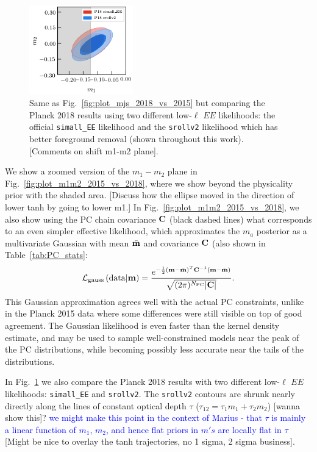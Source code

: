 \documentclass[prd,twocolumn,amsmath,amssymb,floatfix,superscriptaddress,nofootinbib]{revtex4-1}
\newcommand{\wh}[1]{\textcolor{blue}{#1}}
\begin{document}
\begin{figure}
\includegraphics[width=0.4\textwidth]{plots/plot_m1_m2_pl18_pc_zmax30_pliklite_0930_vs_pl18_pc_zmax30_pliklite_srollv2_1015.png}
\caption{Same as Fig.~\ref{fig:plot_mjs_2018_vs_2015} but comparing the Planck 2018 results using two different low-$\ell$ $EE$ likelihoods: the official \texttt{simall\_EE} likelihood and the \texttt{srollv2} likelihood which has better foreground removal (shown throughout this work). [Comments on shift m1-m2 plane].
}
\label{fig:plot_m1m2_lowE_vs_srollv2}
\end{figure}
We show a zoomed version of the $m_1-m_2$ plane in Fig.~\ref{fig:plot_m1m2_2015_vs_2018}, where we show beyond the physicality prior with the shaded area. [Discuss how the ellipse moved in the direction of lower tanh by going to lower m1.] 
In Fig.~\ref{fig:plot_m1m2_2015_vs_2018}, we also show using the PC chain covariance $\bf C$ (black dashed lines) what corresponds to an even simpler effective likelihood, which approximates the $m_a$ posterior as a multivariate Gaussian with mean $\bar{\bf m}$ and covariance $\bf C$ (also shown in Table~\ref{tab:PC_stats}:
\begin{equation}
 {\cal L}_{\rm gauss}\left({\rm data}|\mathbf{m} \right) = \frac{ e^{-\frac{1}{2} ({\bf m}-\bar{\bf m})^T {\bf C}^{-1} ({\bf m}-\bar{\bf m}) } }{\sqrt{(2\pi)^{N_{\rm PC}} | \mathbf{C}| }}.
 \label{eq:gaussian}
 \end{equation}
 This Gaussian approximation agrees well with the actual PC constraints, unlike in the Planck 2015 data where some differences were still visible on top of good agreement. The Gaussian likelihood is even faster than the kernel density estimate, and may be used to sample well-constrained models near the peak of the PC distributions, while becoming possibly less accurate near the tails of the distributions.

In Fig.~\ref{fig:plot_m1m2_lowE_vs_srollv2} we also compare the Planck 2018 results with two different low-$\ell$ $EE$ likelihoods: \texttt{simall\_EE} and \texttt{srollv2}. The \texttt{srollv2} contours are shrunk nearly directly along the lines of constant optical depth $\tau$ ($\tau_{12} = \tau_1 m_1 + \tau_2 m_2$) [wanna show this]? \wh{we might make this point in the context of Marius - that $\tau$ is mainly a linear function of $m_1$, $m_2$, and hence flat priors in $m's$ are locally flat in $\tau$}  [Might be nice to overlay the tanh trajectories, no 1 sigma, 2 sigma business]. 
\end{document}
